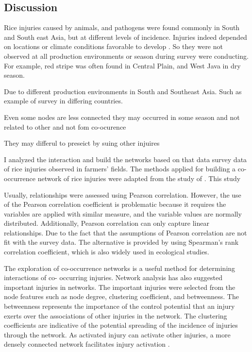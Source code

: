 \subsection{Discussion}

Rice injuries caused by animals, and pathogens were found commonly in South and South east Asia, but at different levels of incidence. Injuries indeed depended on locations or climate conditions favorable to develop \citep{Savary_2006_Quantification}. So they were not observed at all production environments or season during survey were conducting. For example, red stripe was often found in Central Plain, and West Java in dry season. 


Due to different production environments in South and Southeast Asia. Such as example of survey in differing countries. 
\cite{Elazegui_1990_Methodology} \cite{Pinnschmidt_1995_Characterization}

Even some nodes are less connected they may occurred in some season and not related to other and not fom co-ocurence

They may differul to preseict by suing other injuires 


I analyzed the interaction and build the networks based on that data survey data of rice injuries observed in farmers’ fields. The methods applied for building a co-occurrence network of rice injuries were adapted from the study of \citet{Williams_2014_demonstrating}. This study 

Usually, relationships were assessed using Pearson correlation. However, the use of the Pearson correlation coefficient is problematic because it requires the variables are applied with similar measure, and the variable values are normally distributed. Additionally, Pearson correlation can only capture linear relationships. Due to the fact that the assumptions of Pearson correlation are not fit with the survey data. The alternative is provided by using Spearman’s rank correlation coefficient, which is also widely used in ecological studies.

The exploration of co-occurrence networks is a useful method for determining interactions of co- occurring injuries. Network analysis has also suggested important injuries in networks. The important injuries were selected from the node features such as node degree, clustering coefficient, and betweenness. The betweenness represents the importance of the control potential that an injury exerts over the associations of other injuries in the network. The clustering coefficients are indicative of the potential spreading of the incidence of injuries through the network. As activated injury can activate other injuries, a more densely connected network facilitates injury activation \cite{Williams_2014_demonstrating}. 


